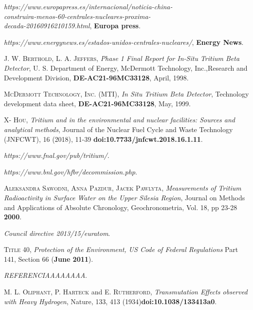 \begin{thebibliography}{100}
\textit{https://www.europapress.es/internacional/noticia-china-\\
construira-menos-60-centrales-nucleares-proxima-\\
decada-20160916210159.html}, 
\textbf{Europa press}.

\textit{https://www.energynews.es/estados-unidos-centrales-nucleares/}, 
\textbf{Energy News}.

 \textsc{J. W. Berthold}, \textsc{L. A. Jeffers},
\textit{Phase 1 Final Report for In-Situ Tritium Beta Detector}, 
U. S. Department of Energy, McDermott Technology, Inc.,Research and Development Division, 	\textbf{DE-AC21-96MC33128}, April, 1998.

 \textsc{McDermott Technology, Inc. (MTI)}, 
\textit{In Situ Tritium Beta Detector}, 
Technology development data sheet, \textbf{DE-AC21-96MC33128}, May, 1999.

 \textsc{X- Hou},  
\textit{Tritium and  in the environmental and nuclear facilities: Sources and analytical methods}, Journal of the Nuclear Fuel Cycle and Waste Technology (JNFCWT), 16 (2018), 11-39 \textbf{doi:10.7733/jnfcwt.2018.16.1.11}.

\textit{https://www.fnal.gov/pub/tritium/}.

\textit{https://www.bnl.gov/hfbr/decommission.php}.

 \textsc{Aleksandra Sawodni}, \textsc{Anna Pazdur}, \textsc{Jacek Pawlyta}, 
\textit{Measurements of Tritium Radioactivity in Surface Water on the Upper Silesia Region}, Journal on Methods and Applications of Absolute Chronology, Geochronometria, Vol. 18, pp 23-28 \textbf{2000}.

\textit{Council directive 2013/15/euratom}.

 \textsc{Title 40},  
\textit{Protection of the Environment, US Code of Federal Regulations} Part 141, Section 66 (\textbf{June 2011}).

\textit{REFERENCIAAAAAAAA}.

 \textsc{M. L. Oliphant}, \textsc{P. Harteck} and \textsc{E. Rutherford},  
\textit{Transmutation Effects observed with Heavy Hydrogen}, Nature, 133, 413 (1934)\textbf{doi:10.1038/133413a0}.


\end{thebibliography}
